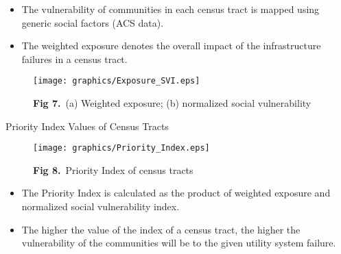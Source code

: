 \documentclass[ctrsize,landscape]{baposter}
\begin{document}
\begin{poster}
\begin{posterbox}[name=problems,column=2,row = 0, headerColorOne=white, headerborder = open]{}
\begin{minipage}{0.45\textwidth}
\begin{itemize}
        \item The vulnerability of communities in each census tract is mapped using generic social factors (ACS data).
        \item The weighted exposure denotes the overall impact of the infrastructure failures in a census tract.
    \end{itemize}
    \end{minipage}\hfill
    \begin{minipage}{0.5\textwidth}
    \begin{figure}[H]
    \captionsetup{justification=raggedright, singlelinecheck=false}
      \texttt{[image: graphics/Exposure\_SVI.eps]}
      \caption*{\textcolor{utblack}{\scriptsize \textbf{Fig 7.}~(a) Weighted exposure; (b) normalized social vulnerability}}
      \label{fig:Exposure_SVI}
    \end{figure}
    \end{minipage}
    \vspace*{-0.4cm}
    \begin{description}
        \item [Priority Index Values of Census Tracts]
    \end{description}
    \begin{minipage}{0.3\textwidth}
     \begin{figure}[H]
      \captionsetup{justification=raggedright, singlelinecheck=false}
      \texttt{[image: graphics/Priority\_Index.eps]}
      \caption*{\textcolor{utblack}{\scriptsize \textbf{Fig 8.}~Priority Index of census tracts}}
      \label{fig:PI}
    \end{figure}
    \end{minipage}\hfill
     \begin{minipage}{0.67\textwidth}
        \vspace*{-1.5cm}\begin{itemize}
            \item The Priority Index is calculated as the product of weighted exposure and normalized social vulnerability index.
            \item The higher the value of the index of a census tract, the higher the vulnerability of the communities will be to the given utility system failure.
        \end{itemize}
    \end{minipage}
\end{posterbox}


\end{poster}
\end{document}
